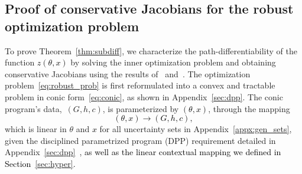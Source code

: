 \documentclass[11pt]{article}
\newcommand{\bsnote}[1]{\noindent\textcolor{red}{\texttt{Bartolomeo: #1}}}
\newcommand{\RC}[1]{\textcolor{black}{#1}}
\begin{document}
\begin{appendices}
\section{Proof of conservative Jacobians for the robust optimization problem}
\label{appx:subdiff}
To prove Theorem~\ref{thm:subdiff},
we characterize the path-differentiability of the function \RC{$z(\theta,x)$} by solving the inner optimization problem and obtaining conservative Jacobians using the results of~\cite{diffcp2019} and~\cite{path-diff}. 
The optimization problem~\eqref{eq:robust_prob} is first reformulated into a convex and tractable problem in conic form~\eqref{eq:conic}, as shown in Appendix~\ref{sec:dpp}. 
The conic program's data,~$(G,h,c)$, is parameterized by \RC{$(\theta,x)$}, through the mapping 
\RC{$$(\theta,x) \rightarrow (G,h,c),$$}
which is linear in $\theta$ and \RC{$x$} for all uncertainty sets in Appendix~\ref{appx:gen_sets}, given the disciplined parametrized program (DPP) requirement detailed in Appendix~\ref{sec:dpp}~\citep[Lemma 1]{cvxpylayers2019}, \RC{as well as the linear contextual mapping we defined in Section~\ref{sec:hyper}.}




\end{appendices}
\end{document}
